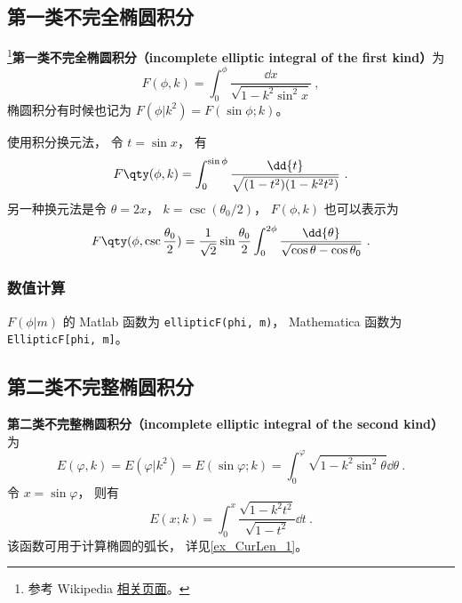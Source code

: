 

\subsection{第一类不完全椭圆积分}
\footnote{参考 Wikipedia \href{https://en.wikipedia.org/wiki/Elliptic_integral}{相关页面}。}\textbf{第一类不完全椭圆积分（incomplete elliptic integral of the first kind）}为
\begin{equation}\label{eq_EliInt_1}
F(\phi, k) = \int_0^\phi \frac{\dd{x}}{\sqrt{1 - k^2\sin^2 x}}~,
\end{equation}
椭圆积分有时候也记为 $F(\phi | k^2) = F(\sin\phi ; k)$。

使用积分换元法， 令 $t = \sin x$， 有
\begin{equation}
F\qty(\phi, k) = \int_0^{\sin{\phi}} \frac{\dd{t}}{\sqrt{(1 - t^2)(1 - k^2 t^2)}}~.
\end{equation}
另一种换元法是令 $\theta = 2x$， $k = \csc(\theta_0/2)$， $F(\phi, k)$ 也可以表示为
\begin{equation}\label{eq_EliInt_2}
F\qty(\phi, \csc\frac{\theta_0}{2}) = \frac{1}{\sqrt{2}} \sin\frac{\theta_0}{2} \int_0^{2\phi} \frac{\dd{\theta}}{\sqrt{\cos\theta - \cos\theta_0}}~.
\end{equation}

\subsubsection{数值计算}
$F(\phi | m)$ 的 Matlab 函数为 \verb`ellipticF(phi, m)`， %
Mathematica 函数为 \verb`EllipticF[phi, m]`。


\subsection{第二类不完整椭圆积分}
\textbf{第二类不完整椭圆积分（incomplete elliptic integral of the second kind）}为
\begin{equation}\label{eq_EliInt_3}
E(\varphi, k) = E(\varphi | k^2) = E(\sin\varphi; k) = \int_0^\varphi \sqrt{1 - k^2\sin^2\theta} \dd{\theta}~.
\end{equation}
令 $x = \sin\varphi$， 则有
\begin{equation}
E(x; k) = \int_0^x \frac{\sqrt{1 - k^2t^2}}{\sqrt{1 - t^2}}\dd{t}~.
\end{equation}
该函数可用于计算椭圆的弧长， 详见\autoref{ex_CurLen_1}。

